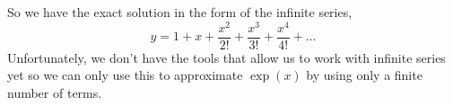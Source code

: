 





So we have the exact solution in the form of the infinite series,
\begin{equation}
  y=1+x+\frac{x^2}{2!}+\frac{x^3}{3!}+\frac{x^4}{4!}+\ldots\label{eq:ExpSeries2}
\end{equation}
Unfortunately, we don't have the tools that allow us to work with
infinite series yet so we can only use this to approximate $\exp(x)$
by using only a finite number of terms.


